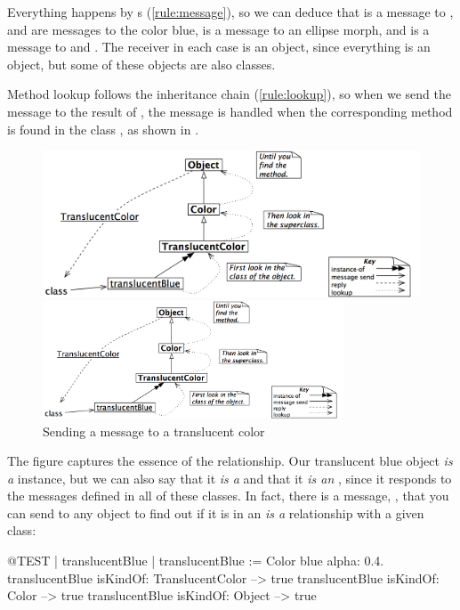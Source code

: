 \documentclass[a4paper,10pt,twoside]{book}
\begin{document}
Everything happens by s (\ref{rule:message}), so we can deduce that  is a message to ,  and  are messages to the color blue,  is a message to an ellipse morph, and  is a message to  and .
The receiver in each case is an object, since everything is an object, but some of these objects are also classes.

Method lookup follows the inheritance chain (\ref{rule:lookup}), so when we send the message  to the result of , the message is handled when the corresponding method is found in the class , as shown in .

\begin{center}
\begin{figure}[!ht]
\ifluluelse
	{\centerline{\includegraphics[width=\textwidth]{TranslucentClassMessage}}}
	{\centerline{\includegraphics[width=0.8\textwidth]{TranslucentClassMessage}}}
\caption{Sending a message to a translucent color\label{fig:classmessage}}
\end{figure}
\end{center}

The figure captures the essence of the  relationship.
Our translucent blue object \emph{is a}  instance, but we can also say that it \emph{is a}  and that it \emph{is an} , since it responds to the messages defined in all of these classes.
In fact, there is a message, , that you can send to any object to find out if it is in an \emph{is a} relationship with a given class:
\begin{code}{@TEST | translucentBlue |}
translucentBlue := Color blue alpha: 0.4.
translucentBlue isKindOf: TranslucentColor --> true
translucentBlue isKindOf: Color                    --> true
translucentBlue isKindOf: Object                  --> true
\end{code}
\end{document}
